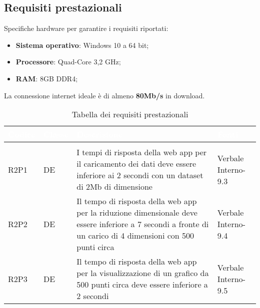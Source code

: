 \subsection{Requisiti prestazionali}


Specifiche hardware per garantire i requisiti riportati:
\begin{itemize}

\item \textbf{Sistema operativo}: Windows 10 a 64 bit;
\item \textbf{Processore}: Quad-Core 3,2 GHz;
\item \textbf{RAM}: 8GB DDR4;

\end{itemize}

La connessione internet ideale è di almeno \textbf{80Mb/s} in download.

\renewcommand{\arraystretch}{1.5}
{
\setlength\arrayrulewidth{1pt}
\begin{longtable}{C{2cm} | C{1.5cm} | C{9cm} | C{3.3cm}}
		\textcolor{white}{\textbf{Codice}} & 
		\textcolor{white}{\textbf{Classe}} & 
		\textcolor{white}{\textbf{Descrizione}} & 
		\textcolor{white}{\textbf{Fonti}} \\
		\endfirsthead
	    \\
	    \endfoot
	    \caption{Tabella dei requisiti prestazionali}
	    \endlastfoot
	    
R2P1 & DE & I tempi di risposta della web app per il caricamento dei dati deve essere inferiore ai 2 secondi con un dataset di 2Mb di dimensione & Verbale Interno-9.3\\
R2P2 & DE & Il tempo di risposta della web app per la riduzione dimensionale deve essere inferiore a 7 secondi a fronte di un carico di 4 dimensioni con 500 punti circa & Verbale Interno-9.4\\
R2P3 & DE & Il tempo di risposta della web app per la visualizzazione di un grafico da 500 punti circa deve essere inferiore a 2 secondi & Verbale Interno-9.5\\

\end{longtable}
}

